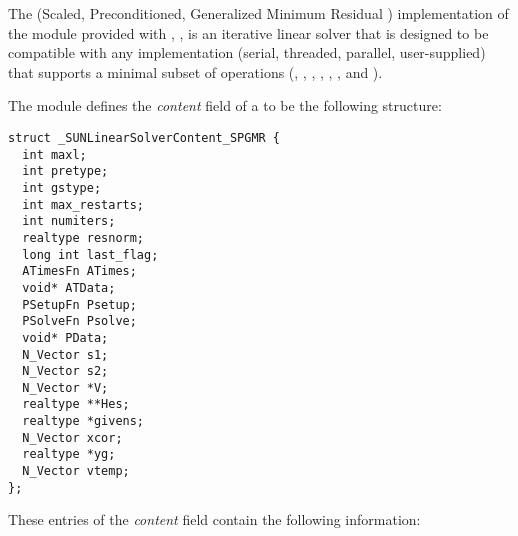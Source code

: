 
The {\spgmr} (Scaled, Preconditioned, Generalized Minimum
Residual \cite{SaSc:86}) implementation of the {\sunlinsol} module
provided with {\sundials}, {\sunlinsolspgmr}, is an iterative linear
solver that is designed to be compatible with any {\nvector}
implementation (serial, threaded, parallel, user-supplied) that
supports a minimal subset of operations (, 
, , , ,
,  and ).  

The {\sunlinsolspgmr} module defines the {\em content} field of a
 to be the following structure:
\begin{verbatim} 
struct _SUNLinearSolverContent_SPGMR {
  int maxl;
  int pretype;
  int gstype;
  int max_restarts;
  int numiters;
  realtype resnorm;
  long int last_flag;
  ATimesFn ATimes;
  void* ATData;
  PSetupFn Psetup;
  PSolveFn Psolve;
  void* PData;
  N_Vector s1;
  N_Vector s2;
  N_Vector *V;
  realtype **Hes;
  realtype *givens;
  N_Vector xcor;
  realtype *yg;
  N_Vector vtemp;
};
\end{verbatim}
These entries of the \emph{content} field contain the following
information:
